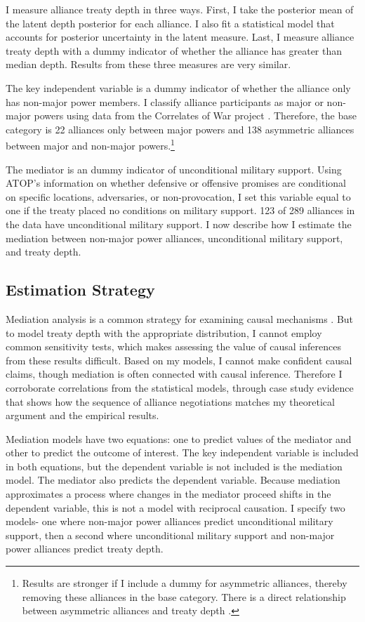 \documentclass[12pt]{article}
\begin{document}
I measure alliance treaty depth in three ways.
First, I take the posterior mean of the latent depth posterior for each alliance. 
I also fit a statistical model that accounts for posterior uncertainty in the latent measure. 
Last, I measure alliance treaty depth with a dummy indicator of whether the alliance has greater than median depth. 
Results from these three measures are very similar. 


The key independent variable is a dummy indicator of whether the alliance only has non-major power members. 
I classify alliance participants as major or non-major powers using data from the Correlates of War project \citep{SingerCINC1988}.
Therefore, the base category is 22 alliances only between major powers and 138 asymmetric alliances between major and non-major powers.\footnote{Results are stronger if I include a dummy for asymmetric alliances, thereby removing these alliances in the base category. There is a direct relationship between asymmetric alliances and treaty depth \citep{Mattes2012}.}  


The mediator is an dummy indicator of unconditional military support. 
Using ATOP's information on whether defensive or offensive promises are conditional on specific locations, adversaries, or non-provocation, I set this variable equal to one if the treaty placed no conditions on military support.
123 of 289 alliances in the data have unconditional military support. 
I now describe how I estimate the mediation between non-major power alliances, unconditional military support, and treaty depth. 


\subsection{Estimation Strategy}

Mediation analysis is a common strategy for examining causal mechanisms \citep{Imaietal2011}. 
But to model treaty depth with the appropriate distribution, I cannot employ common sensitivity tests, which makes assessing the value of causal inferences from these results difficult. 
Based on my models, I cannot make confident causal claims, though mediation is often connected with causal inference. 
Therefore I corroborate correlations from the statistical models, through case study evidence that shows how the sequence of alliance negotiations matches my theoretical argument and the empirical results. 


Mediation models have two equations: one to predict values of the mediator and other to predict the outcome of interest. 
The key independent variable is included in both equations, but the dependent variable is not included is the mediation model. 
The mediator also predicts the dependent variable. 
Because mediation approximates a process where changes in the mediator proceed shifts in the dependent variable, this is not a model with reciprocal causation. 
I specify two models- one where non-major power alliances predict unconditional military support, then a second where unconditional military support and non-major power alliances predict treaty depth. 
\end{document}
